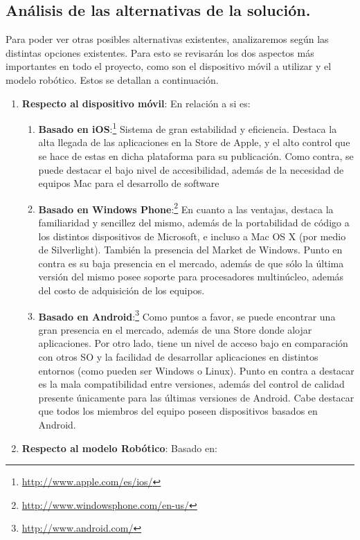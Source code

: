 \newpage
\subsection{An\'alisis de las alternativas de la soluci\'on.}

Para poder ver otras posibles alternativas existentes, analizaremos seg\'un las distintas opciones existentes. Para esto se revisar\'an los dos aspectos m\'as importantes en todo el proyecto, como son el dispositivo m\'ovil a utilizar y el modelo rob\'otico. Estos se detallan a continuaci\'on.
\begin{enumerate}
\item {\bf Respecto al dispositivo m\'ovil}: En relaci\'on a si es:
  \begin{enumerate}
  \item {\bf Basado en iOS}:\footnote{\url{http://www.apple.com/es/ios/}} Sistema de gran estabilidad y eficiencia. Destaca la alta llegada de las aplicaciones en la Store de Apple, y el alto control que se hace de estas en dicha plataforma para su publicaci\'on. Como contra, se puede destacar el bajo nivel de accesibilidad, adem\'as de la necesidad de equipos Mac para el desarrollo de software
  \item {\bf Basado en Windows Phone}:\footnote{\url{http://www.windowsphone.com/en-us/}} En cuanto a las ventajas, destaca la familiaridad y sencillez del mismo, adem\'as de la portabilidad de c\'odigo a los distintos dispositivos de Microsoft, e incluso a Mac OS X (por medio de Silverlight). Tambi\'en la presencia del Market de Windows. Punto en contra es su baja presencia en el mercado, adem\'as de que s\'olo la \'ultima versi\'on del mismo posee soporte para procesadores multin\'ucleo, adem\'as del costo de adquisici\'on de los equipos.
  \item {\bf Basado en Android}:\footnote{\url{http://www.android.com/}} Como puntos a favor, se puede encontrar una gran presencia en el mercado, adem\'as de una Store donde alojar aplicaciones. Por otro lado, tiene un nivel de acceso bajo en comparaci\'on con otros SO y la facilidad de desarrollar aplicaciones en distintos entornos (como pueden ser Windows o Linux). Punto en contra a destacar es la mala compatibilidad entre versiones, adem\'as del control de calidad presente \'unicamente para las \'ultimas versiones de Android. Cabe destacar que todos los miembros del equipo poseen dispositivos basados en Android.
  \end{enumerate}
\item {\bf Respecto al modelo Rob\'otico}: Basado en:

\end{enumerate}
